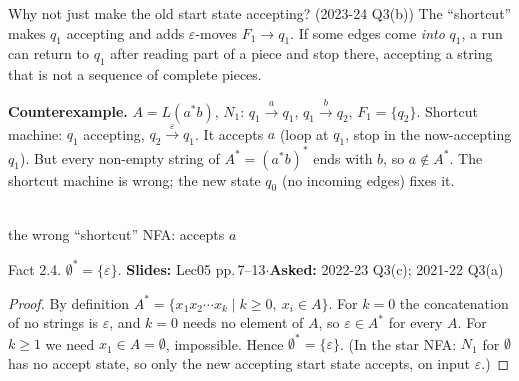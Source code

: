 \documentclass[10.5pt,a4paper]{article}
\newcommand{\src}[2]{{\footnotesize\color{gray!70!black}\textbf{Slides:} #1\enspace$\cdot$\enspace\textbf{Asked:} #2}\par}
\newcommand{\eps}{\varepsilon}
\begin{document}
\begin{ans}{Why not just make the old start state accepting? (2023-24 Q3(b))}
The ``shortcut'' makes $q_1$ accepting and adds $\eps$-moves $F_1\to q_1$. If some edges come \emph{into} $q_1$, a run can return to
$q_1$ after reading part of a piece and stop there, accepting a string that is not a sequence of complete pieces.\\[2pt]
\begin{minipage}{0.52\linewidth}
\textbf{Counterexample.} $A=L(a^*b)$, $N_1$: $q_1\xrightarrow{a}q_1$, $q_1\xrightarrow{b}q_2$, $F_1=\{q_2\}$.
Shortcut machine: $q_1$ accepting, $q_2\xrightarrow{\eps}q_1$. It accepts $a$ (loop at $q_1$, stop in the now-accepting $q_1$).
But every non-empty string of $A^*=(a^*b)^*$ ends with $b$, so $a\notin A^*$. The shortcut machine is wrong; the new state $q_0$ (no
incoming edges) fixes it.
\end{minipage}\hfill
\begin{minipage}{0.44\linewidth}\centering
{}\\[-2pt]{\footnotesize the wrong ``shortcut'' NFA: accepts $a$}
\end{minipage}
\end{ans}

\begin{thm}{Fact 2.4. $\emptyset^*=\{\eps\}$.}
\src{Lec05 pp.\,7--13}{2022-23 Q3(c); 2021-22 Q3(a)}
\end{thm}
\begin{proof}
By definition $A^*=\{x_1x_2\cdots x_k\mid k\ge0,\ x_i\in A\}$. For $k=0$ the concatenation of no strings is $\eps$, and $k=0$ needs no
element of $A$, so $\eps\in A^*$ for every $A$. For $k\ge1$ we need $x_1\in A=\emptyset$, impossible. Hence $\emptyset^*=\{\eps\}$.
(In the star NFA: $N_1$ for $\emptyset$ has no accept state, so only the new accepting start state accepts, on input $\eps$.)
\end{proof}
\end{document}
